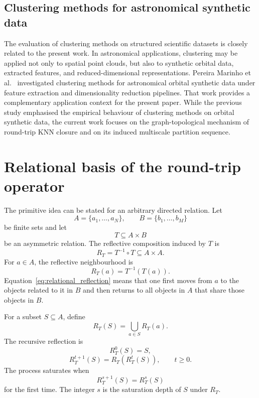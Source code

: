 \documentclass[pdflatex,sn-mathphys-num]{sn-jnl}
\begin{document}
\subsection{Clustering methods for astronomical synthetic data}

The evaluation of clustering methods on structured scientific datasets is closely related to the present work. In astronomical applications, clustering may be applied not only to spatial point clouds, but also to synthetic orbital data, extracted features, and reduced-dimensional representations. Pereira Marinho et al.~\citep{PereiraMarinho2026ClusteringAO} investigated clustering methods for astronomical orbital synthetic data under feature extraction and dimensionality reduction pipelines. That work provides a complementary application context for the present paper. While the previous study emphasised the empirical behaviour of clustering methods on orbital synthetic data, the current work focuses on the graph-topological mechanism of round-trip KNN closure and on its induced multiscale partition sequence.

\section{Relational basis of the round-trip operator}\label{sec:relational_origin}

The primitive idea can be stated for an arbitrary directed relation. Let
\begin{equation}
A=\{a_1,\ldots,a_N\},\qquad B=\{b_1,\ldots,b_M\}
\end{equation}
be finite sets and let
\begin{equation}
T\subseteq A\times B
\end{equation}
be an asymmetric relation. The reflective composition induced by $T$ is
\begin{equation}
R_T=T^{-1}\circ T\subseteq A\times A.
\end{equation}
For $a\in A$, the reflective neighbourhood is
\begin{equation}
R_T(a)=T^{-1}(T(a)).
\label{eq:relational_reflection}
\end{equation}
Equation~\eqref{eq:relational_reflection} means that one first moves from $a$ to the objects related to it in $B$ and then returns to all objects in $A$ that share those objects in $B$.

For a subset $S\subseteq A$, define
\begin{equation}
R_T(S)=\bigcup_{a\in S}R_T(a).
\end{equation}
The recursive reflection is
\begin{equation}
R_T^0(S)=S,
\end{equation}
\begin{equation}
R_T^{t+1}(S)=R_T(R_T^t(S)),\qquad t\geq 0.
\label{eq:relational_iteration}
\end{equation}
The process saturates when
\begin{equation}
R_T^{s+1}(S)=R_T^s(S)
\end{equation}
for the first time. The integer $s$ is the saturation depth of $S$ under $R_T$.
\end{document}
